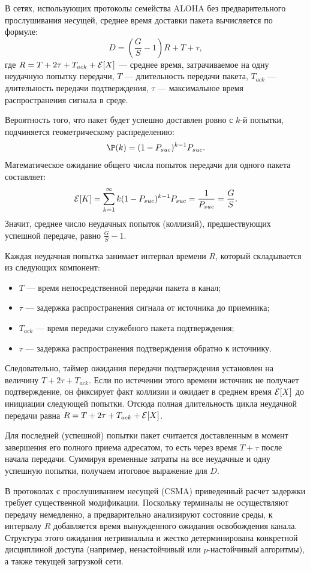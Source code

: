 \begin{statement}
    В сетях, использующих протоколы семейства ALOHA без предварительного прослушивания несущей, среднее время доставки пакета вычисляется по формуле:
    \[
        D = \left( \frac{G}{S} - 1 \right) R + T + \tau,
    \]
    где $R = T + 2\tau + T_{ack} + \mathcal{E}[X]$ — среднее время, затрачиваемое на одну неудачную попытку передачи, $T$ — длительность передачи пакета, $T_{ack}$ — длительность передачи подтверждения, $\tau$ — максимальное время распространения сигнала в среде.
\end{statement}
\begin{sproof}
    Вероятность того, что пакет будет успешно доставлен ровно с $k$-й попытки, подчиняется геометрическому распределению:
    \[
        \P(k) = (1 - P_{suc})^{k-1} P_{suc}.
    \]
    Математическое ожидание общего числа попыток передачи для одного пакета составляет:
    \[
        \mathcal{E}[K] = \sum_{k=1}^{\infty} k (1 - P_{suc})^{k-1} P_{suc} = \frac{1}{P_{suc}} = \frac{G}{S}.
    \]
    Значит, среднее число неудачных попыток (коллизий), предшествующих успешной передаче, равно $\frac{G}{S} - 1$.
    
    Каждая неудачная попытка занимает интервал времени $R$, который складывается из следующих компонент:
    \begin{itemize}
        \item $T$ — время непосредственной передачи пакета в канал;
        \item $\tau$ — задержка распространения сигнала от источника до приемника;
        \item $T_{ack}$ — время передачи служебного пакета подтверждения;
        \item $\tau$ — задержка распространения подтверждения обратно к источнику.
    \end{itemize}
    Следовательно, таймер ожидания передачи подтверждения установлен на величину $T + 2\tau + T_{ack}$. Если по истечении этого времени источник не получает подтверждение, он фиксирует факт коллизии и ожидает в среднем время $\mathcal{E}[X]$ до инициации следующей попытки. Отсюда полная длительность цикла неудачной передачи равна $R = T + 2\tau + T_{ack} + \mathcal{E}[X]$.

    Для последней (успешной) попытки пакет считается доставленным в момент завершения его полного приема адресатом, то есть через время $T + \tau$ после начала передачи. Суммируя временные затраты на все неудачные и одну успешную попытки, получаем итоговое выражение для $D$.
\end{sproof}

\begin{note}
    В протоколах с прослушиванием несущей (CSMA) приведенный расчет задержки требует существенной модификации. Поскольку терминалы не осуществляют передачу немедленно, а предварительно анализируют состояние среды, к интервалу $R$ добавляется время вынужденного ожидания освобождения канала. Структура этого ожидания нетривиальна и жестко детерминирована конкретной дисциплиной доступа (например, ненастойчивый или $p$-настойчивый алгоритмы), а также текущей загрузкой сети.
\end{note}